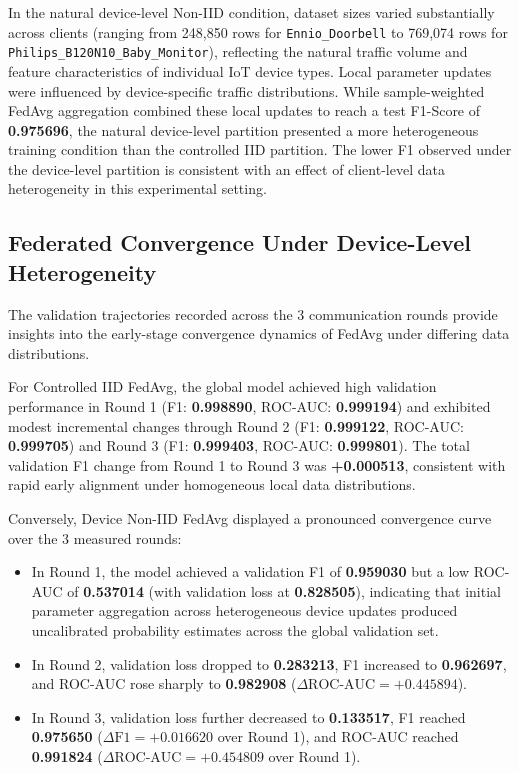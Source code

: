 \documentclass[11pt,a4paper]{article}
\begin{document}
In the natural device-level Non-IID condition, dataset sizes varied substantially across clients (ranging from 248,850 rows for \texttt{Ennio\_Doorbell} to 769,074 rows for \texttt{Philips\_B120N10\_Baby\_Monitor}), reflecting the natural traffic volume and feature characteristics of individual IoT device types. Local parameter updates were influenced by device-specific traffic distributions. While sample-weighted FedAvg aggregation combined these local updates to reach a test F1-Score of \textbf{0.975696}, the natural device-level partition presented a more heterogeneous training condition than the controlled IID partition. The lower F1 observed under the device-level partition is consistent with an effect of client-level data heterogeneity \cite{ref5, ref6} in this experimental setting.

\subsection{Federated Convergence Under Device-Level Heterogeneity}
The validation trajectories recorded across the 3 communication rounds provide insights into the early-stage convergence dynamics of FedAvg under differing data distributions.

For Controlled IID FedAvg, the global model achieved high validation performance in Round 1 (F1: \textbf{0.998890}, ROC-AUC: \textbf{0.999194}) and exhibited modest incremental changes through Round 2 (F1: \textbf{0.999122}, ROC-AUC: \textbf{0.999705}) and Round 3 (F1: \textbf{0.999403}, ROC-AUC: \textbf{0.999801}). The total validation F1 change from Round 1 to Round 3 was \textbf{+0.000513}, consistent with rapid early alignment under homogeneous local data distributions.

Conversely, Device Non-IID FedAvg displayed a pronounced convergence curve over the 3 measured rounds:

\begin{itemize}
    \item In Round 1, the model achieved a validation F1 of \textbf{0.959030} but a low ROC-AUC of \textbf{0.537014} (with validation loss at \textbf{0.828505}), indicating that initial parameter aggregation across heterogeneous device updates produced uncalibrated probability estimates across the global validation set.
    \item In Round 2, validation loss dropped to \textbf{0.283213}, F1 increased to \textbf{0.962697}, and ROC-AUC rose sharply to \textbf{0.982908} ($\Delta\text{ROC-AUC} = +0.445894$).
    \item In Round 3, validation loss further decreased to \textbf{0.133517}, F1 reached \textbf{0.975650} ($\Delta\text{F1} = +0.016620$ over Round 1), and ROC-AUC reached \textbf{0.991824} ($\Delta\text{ROC-AUC} = +0.454809$ over Round 1).
\end{itemize}
\end{document}
